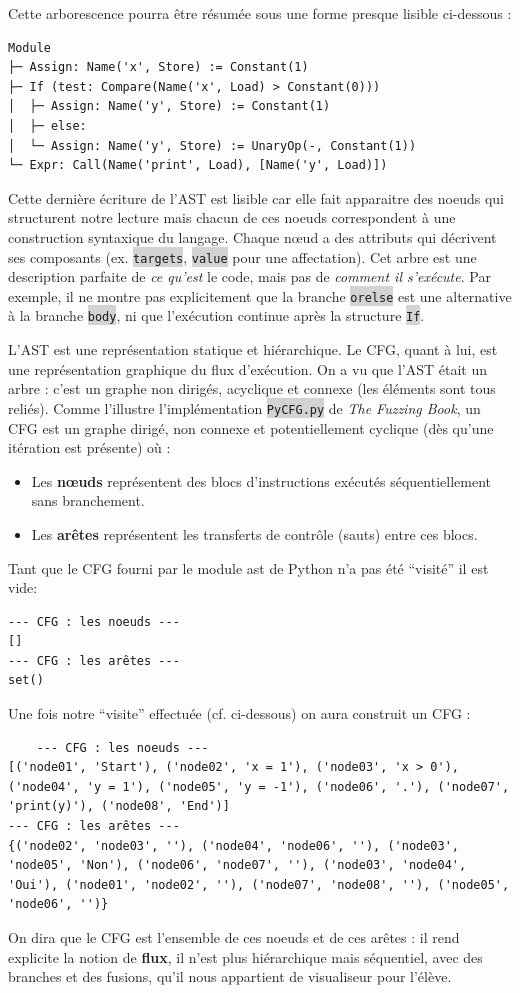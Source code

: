 \documentclass[11pt,a4paper]{article}
\newcommand{\code}[1]{\colorbox{lightgray}{\texttt{\small #1}}}
\begin{document}
Cette arborescence pourra être résumée sous une forme presque lisible ci-dessous :
\begin{verbatim}
Module
├─ Assign: Name('x', Store) := Constant(1)
├─ If (test: Compare(Name('x', Load) > Constant(0)))
│  ├─ Assign: Name('y', Store) := Constant(1)
│  ├─ else:
│  └─ Assign: Name('y', Store) := UnaryOp(-, Constant(1))
└─ Expr: Call(Name('print', Load), [Name('y', Load)])
\end{verbatim}
Cette dernière écriture de l'AST est lisible car elle fait apparaitre des noeuds qui structurent notre lecture mais
chacun de ces noeuds correspondent à une construction syntaxique du langage. Chaque nœud a des attributs qui décrivent ses 
composants (ex. \code{targets}, \code{value} pour une affectation).
Cet arbre est une description parfaite de \textit{ce qu'est} le code, mais pas de \textit{comment il s'exécute}. 
Par exemple, il ne montre pas explicitement que la branche \code{orelse} est une alternative à la branche 
\code{body}, ni que l'exécution continue après la structure \code{If}. \par  L'AST est une représentation statique et 
hiérarchique. Le CFG, quant à lui, est une représentation graphique du flux d'exécution.
On a vu que l'AST était un arbre : c'est un graphe non dirigés, acyclique et connexe (les éléments sont tous reliés).
Comme l'illustre l'implémentation \code{PyCFG.py} de \textit{The Fuzzing Book}, un CFG est un graphe dirigé, non
connexe et potentiellement cyclique (dès qu'une itération est présente) où :
\begin{itemize}
    \item Les \textbf{nœuds} représentent des blocs d'instructions exécutés séquentiellement sans branchement.
    \item Les \textbf{arêtes} représentent les transferts de contrôle (sauts) entre ces blocs.
\end{itemize}
Tant que le CFG fourni par le module ast de Python n'a pas été ``visité'' il est vide:
\begin{verbatim}
--- CFG : les noeuds ---
[]
--- CFG : les arêtes ---
set()
\end{verbatim}
Une fois notre ``visite'' effectuée (cf. ci-dessous) on aura construit un CFG :
\begin{verbatim}
    --- CFG : les noeuds ---
[('node01', 'Start'), ('node02', 'x = 1'), ('node03', 'x > 0'), ('node04', 'y = 1'), ('node05', 'y = -1'), ('node06', '.'), ('node07', 'print(y)'), ('node08', 'End')]
--- CFG : les arêtes ---
{('node02', 'node03', ''), ('node04', 'node06', ''), ('node03', 'node05', 'Non'), ('node06', 'node07', ''), ('node03', 'node04', 'Oui'), ('node01', 'node02', ''), ('node07', 'node08', ''), ('node05', 'node06', '')}
\end{verbatim}
On dira que le CFG est l'ensemble de ces noeuds et de ces arêtes : il rend explicite la notion de \textbf{flux},
 il n'est plus hiérarchique mais séquentiel, avec des branches et des fusions, qu'il nous appartient de visualiseur
 pour l'élève.
\end{document}
